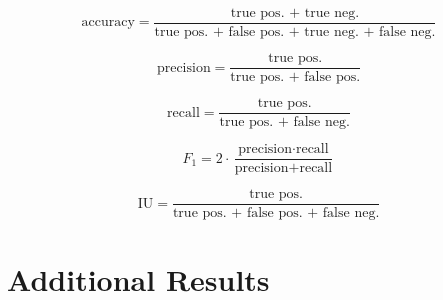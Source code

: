 $$ \text{accuracy} = \frac{\text{true pos. + true neg.}}{\text{true pos. + false pos. + true neg. + false neg.}}$$

$$\text{precision} = \frac{\text{true pos.}}{\text{true pos. + false pos.}}$$

$$\text{recall} = \frac{\text{true pos.}}{\text{true pos. + false neg.}}$$

$$F_1 = 2 \cdot \frac{\text{precision} \cdot \text{recall}}{\text{precision}+\text{recall}}$$

$$ \text{IU} = \frac{\text{true pos.}}{\text{true pos. + false pos. + false neg.}}$$


\section{Additional Results}

